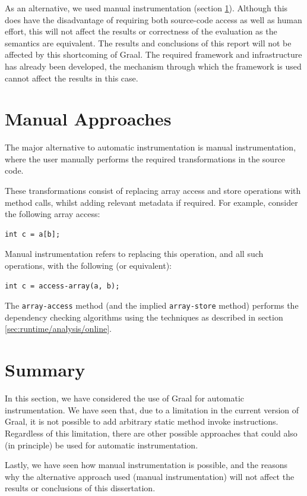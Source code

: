 	As an alternative, we used manual instrumentation (section \ref{sec:instrumentation/manual}). Although this does have the disadvantage of requiring both source-code access as well as human effort, this will not affect the results or correctness of the evaluation as the semantics are equivalent. The results and conclusions of this report will not be affected by this shortcoming of Graal. The required framework and infrastructure has already been developed, the mechanism through which the framework is used cannot affect the results in this case.
	
\section{Manual Approaches} \label{sec:instrumentation/manual}
The major alternative to automatic instrumentation is manual instrumentation, where the user manually performs the required transformations in the source code.

These transformations consist of replacing array access and store operations with method calls, whilst adding relevant metadata if required. For example, consider the following array access:

\begin{lstlisting}[label=list:array-access,caption=Standard array access in Java]
int c = a[b];\end{lstlisting}

Manual instrumentation refers to replacing this operation, and all such operations, with the following (or equivalent):

\begin{lstlisting}[label=list:instrumented-array-access,caption=Instrumented array access]
int c = access-array(a, b);\end{lstlisting}

The \texttt{array-access} method (and the implied \texttt{array-store} method) performs the dependency checking algorithms using the techniques as described in section \ref{sec:runtime/analysis/online}.
	
\section{Summary} \label{sec:instrumentation/summary}
In this section, we have considered the use of Graal for automatic instrumentation. We have seen that, due to a limitation in the current version of Graal, it is not possible to add arbitrary static method invoke instructions. Regardless of this limitation, there are other possible approaches that could also (in principle) be used for automatic instrumentation.

Lastly, we have seen how manual instrumentation is possible, and the reasons why the alternative approach used (manual instrumentation) will not affect the results or conclusions of this dissertation.